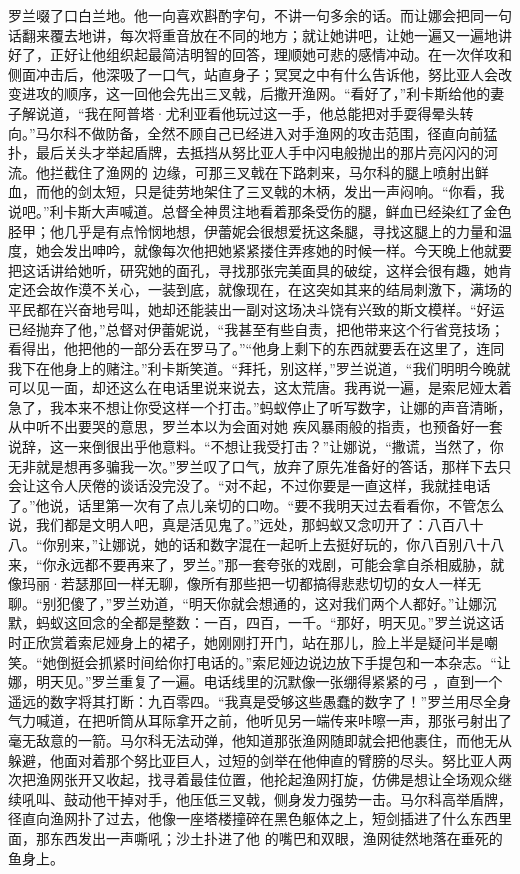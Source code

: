 \documentclass{article}
\begin{document}
罗兰啜了口白兰地。他一向喜欢斟酌字句，不讲一句多余的话。而让娜会把同一句话翻来覆去地讲，每次将重音放在不同的地方；就让她讲吧，让她一遍又一遍地讲好了，正好让他组织起最简洁明智的回答，理顺她可悲的感情冲动。在一次佯攻和侧面冲击后，他深吸了一口气，站直身子；冥冥之中有什么告诉他，努比亚人会改变进攻的顺序，这一回他会先出三叉戟，后撒开渔网。“看好了，”利卡斯给他的妻子解说道，“我在阿普塔·尤利亚看他玩过这一手，他总能把对手耍得晕头转向。”马尔科不做防备，全然不顾自己已经进入对手渔网的攻击范围，径直向前猛扑，最后关头才举起盾牌，去抵挡从努比亚人手中闪电般抛出的那片亮闪闪的河流。他拦截住了渔网的
\newpage
边缘，可那三叉戟在下路刺来，马尔科的腿上喷射出鲜血，而他的剑太短，只是徒劳地架住了三叉戟的木柄，发出一声闷响。“你看，我说吧。”利卡斯大声喊道。总督全神贯注地看着那条受伤的腿，鲜血已经染红了金色胫甲；他几乎是有点怜悯地想，伊蕾妮会很想爱抚这条腿，寻找这腿上的力量和温度，她会发出呻吟，就像每次他把她紧紧搂住弄疼她的时候一样。今天晚上他就要把这话讲给她听，研究她的面孔，寻找那张完美面具的破绽，这样会很有趣，她肯定还会故作漠不关心，一装到底，就像现在，在这突如其来的结局刺激下，满场的平民都在兴奋地号叫，她却还能装出一副对这场决斗饶有兴致的斯文模样。“好运已经抛弃了他，”总督对伊蕾妮说，“我甚至有些自责，把他带来这个行省竞技场；看得出，他把他的一部分丢在罗马了。”“他身上剩下的东西就要丢在这里了，连同我下在他身上的赌注。”利卡斯笑道。“拜托，别这样，”罗兰说道，“我们明明今晚就可以见一面，却还这么在电话里说来说去，这太荒唐。我再说一遍，是索尼娅太着急了，我本来不想让你受这样一个打击。”蚂蚁停止了听写数字，让娜的声音清晰，从中听不出要哭的意思，罗兰本以为会面对她
\newpage
疾风暴雨般的指责，也预备好一套说辞，这一来倒很出乎他意料。“不想让我受打击？”让娜说，“撒谎，当然了，你无非就是想再多骗我一次。”罗兰叹了口气，放弃了原先准备好的答话，那样下去只会让这令人厌倦的谈话没完没了。“对不起，不过你要是一直这样，我就挂电话了。”他说，话里第一次有了点儿亲切的口吻。“要不我明天过去看看你，不管怎么说，我们都是文明人吧，真是活见鬼了。”远处，那蚂蚁又念叨开了：八百八十八。“你别来，”让娜说，她的话和数字混在一起听上去挺好玩的，你八百别八十八来，“你永远都不要再来了，罗兰。”那一套夸张的戏剧，可能会拿自杀相威胁，就像玛丽·若瑟那回一样无聊，像所有那些把一切都搞得悲悲切切的女人一样无聊。“别犯傻了，”罗兰劝道，“明天你就会想通的，这对我们两个人都好。”让娜沉默，蚂蚁这回念的全都是整数：一百，四百，一千。“那好，明天见。”罗兰说这话时正欣赏着索尼娅身上的裙子，她刚刚打开门，站在那儿，脸上半是疑问半是嘲笑。“她倒挺会抓紧时间给你打电话的。”索尼娅边说边放下手提包和一本杂志。“让娜，明天见。”罗兰重复了一遍。电话线里的沉默像一张绷得紧紧的弓
\newpage
，直到一个遥远的数字将其打断：九百零四。“我真是受够这些愚蠢的数字了！”罗兰用尽全身气力喊道，在把听筒从耳际拿开之前，他听见另一端传来咔嚓一声，那张弓射出了毫无敌意的一箭。马尔科无法动弹，他知道那张渔网随即就会把他裹住，而他无从躲避，他面对着那个努比亚巨人，过短的剑举在他伸直的臂膀的尽头。努比亚人两次把渔网张开又收起，找寻着最佳位置，他抡起渔网打旋，仿佛是想让全场观众继续吼叫、鼓动他干掉对手，他压低三叉戟，侧身发力强势一击。马尔科高举盾牌，径直向渔网扑了过去，他像一座塔楼撞碎在黑色躯体之上，短剑插进了什么东西里面，那东西发出一声嘶吼；沙土扑进了他
的嘴巴和双眼，渔网徒然地落在垂死的鱼身上。 
\end{document}
